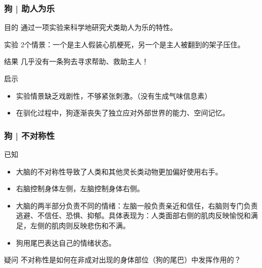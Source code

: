 \begin{frame}
  \frametitle{狗 | 助人为乐}
  \begin{block}{目的}
    通过一项实验来科学地研究犬类助人为乐的特性。
  \end{block}
  \pause
  \begin{block}{实验}
    2个情景：一个是主人假装心肌梗死，另一个是主人被翻到的架子压住。
  \end{block}
  \pause
  \begin{block}{结果}
    几乎没有一条狗去寻求帮助、救助主人！
  \end{block}
  \pause
  \begin{block}{启示}
    \begin{itemize}
      \item 实验情景缺乏戏剧性，不够紧张刺激。（没有生成气味信息素）
      \item 在驯化过程中，狗逐渐丧失了独立应对外部世界的能力、空间记忆。
    \end{itemize}
  \end{block}
\end{frame}

\begin{frame}
  \frametitle{狗 | 不对称性}
  \begin{block}{已知}
    \begin{itemize}
      \item 大脑的不对称性导致了人类和其他灵长类动物更加偏好使用右手。
      \item 右脑控制身体左侧，左脑控制身体右侧。
      \item 大脑的两半部分负责不同的情绪：左脑一般负责亲近和信任，右脑则专门负责逃避、不信任、恐惧、抑郁。具体表现为：人类面部右侧的肌肉反映愉悦和满足，左侧的肌肉则反映悲伤和不满。
      \item 狗用尾巴表达自己的情绪状态。
    \end{itemize}
  \end{block}
  \pause
  \begin{block}{疑问}
    不对称性是如何在非成对出现的身体部位（狗的尾巴）中发挥作用的？
  \end{block}
\end{frame}

